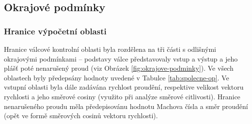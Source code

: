             
     \newpage      
    \subsection{Okrajové podmínky}
        \subsubsection{Hranice výpočetní oblasti}
			Hranice válcové kontrolní oblasti byla rozdělena na tři části s odlišnými okrajovými podmínkami – podstavy válce představovaly vstup a výstup a jeho plášť poté nenarušený proud (viz Obrázek \ref{fig:okrajove-podminky}). Ve všech oblastech byly předepsány hodnoty uvedené v Tabulce \ref{tab:spolecne-op}. Ve vstupní oblasti byla dále zadávána rychlost proudění, respektive velikost vektoru rychlosti a jeho směrové cosiny (využito při analýze směrové citlivosti). Hranice nenarušeného proudu měla předepisovánu hodnotu Machova čísla a směr proudění (opět ve formě směrových cosinů vektoru rychlosti). 


